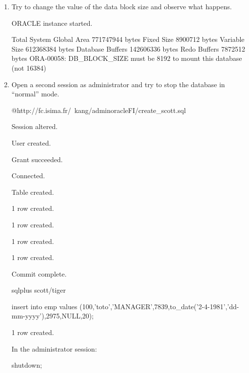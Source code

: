\documentclass{article}
\begin{document}
\begin{enumerate}
  \item Try to change the value of the data block size and observe what happens.
\begin{messageshell}
ORACLE instance started.

Total System Global Area  771747944 bytes
Fixed Size                  8900712 bytes
Variable Size                612368384 bytes
Database Buffers         142606336 bytes
Redo Buffers                  7872512 bytes
ORA-00058: DB_BLOCK_SIZE must be 8192 to mount this database (not 16384)

\end{messageshell}
  \item Open a second session as administrator and try to stop the database in “normal” mode. 
\begin{sqlshell}
@http://fc.isima.fr/~kang/adminoracleFI/create_scott.sql
\end{sqlshell}
\begin{messageshell}
Session altered.

User created.

Grant succeeded.

Connected.

Table created.

1 row created.

1 row created.

1 row created.

1 row created.

Commit complete.

\end{messageshell}
\begin{commandshell}
sqlplus scott/tiger
\end{commandshell}
\begin{sqlshell}
insert into emp values
(100,'toto','MANAGER',7839,to_date('2-4-1981','dd-mm-yyyy'),2975,NULL,20);
\end{sqlshell}

\begin{messageshell}

1 row created.

\end{messageshell}

In the administrator session:
\begin{sqlshell}
shutdown;
\end{sqlshell}


\end{enumerate}
\end{document}
